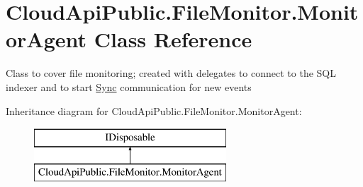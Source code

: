 \hypertarget{class_cloud_api_public_1_1_file_monitor_1_1_monitor_agent}{\section{Cloud\-Api\-Public.\-File\-Monitor.\-Monitor\-Agent Class Reference}
\label{class_cloud_api_public_1_1_file_monitor_1_1_monitor_agent}
}


Class to cover file monitoring; created with delegates to connect to the S\-Q\-L indexer and to start \hyperlink{namespace_cloud_api_public_1_1_sync}{Sync} communication for new events  


Inheritance diagram for Cloud\-Api\-Public.\-File\-Monitor.\-Monitor\-Agent\-:\begin{figure}[H]
\begin{center}
\leavevmode
\includegraphics[height=2.000000cm]{class_cloud_api_public_1_1_file_monitor_1_1_monitor_agent}
\end{center}
\end{figure}
